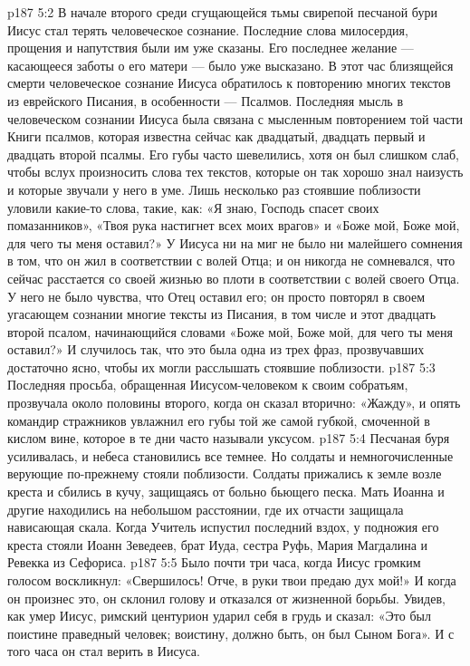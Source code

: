 \vs p187 5:2 В начале второго среди сгущающейся тьмы свирепой песчаной бури Иисус стал терять человеческое сознание. Последние слова милосердия, прощения и напутствия были им уже сказаны. Его последнее желание --- касающееся заботы о его матери --- было уже высказано. В этот час близящейся смерти человеческое сознание Иисуса обратилось к повторению многих текстов из еврейского Писания, в особенности --- Псалмов. Последняя мысль в человеческом сознании Иисуса была связана с мысленным повторением той части Книги псалмов, которая известна сейчас как двадцатый, двадцать первый и двадцать второй псалмы. Его губы часто шевелились, хотя он был слишком слаб, чтобы вслух произносить слова тех текстов, которые он так хорошо знал наизусть и которые звучали у него в уме. Лишь несколько раз стоявшие поблизости уловили какие\hyp{}то слова, такие, как: «Я знаю, Господь спасет своих помазанников», «Твоя рука настигнет всех моих врагов» и «Боже мой, Боже мой, для чего ты меня оставил?» У Иисуса ни на миг не было ни малейшего сомнения в том, что он жил в соответствии с волей Отца; и он никогда не сомневался, что сейчас расстается со своей жизнью во плоти в соответствии с волей своего Отца. У него не было чувства, что Отец оставил его; он просто повторял в своем угасающем сознании многие тексты из Писания, в том числе и этот двадцать второй псалом, начинающийся словами «Боже мой, Боже мой, для чего ты меня оставил?» И случилось так, что это была одна из трех фраз, прозвучавших достаточно ясно, чтобы их могли расслышать стоявшие поблизости.
\vs p187 5:3 \pc Последняя просьба, обращенная Иисусом\hyp{}человеком к своим собратьям, прозвучала около половины второго, когда он сказал вторично: «Жажду», и опять командир стражников увлажнил его губы той же самой губкой, смоченной в кислом вине, которое в те дни часто называли уксусом.
\vs p187 5:4 \pc Песчаная буря усиливалась, и небеса становились все темнее. Но солдаты и немногочисленные верующие по\hyp{}прежнему стояли поблизости. Солдаты прижались к земле возле креста и сбились в кучу, защищаясь от больно бьющего песка. Мать Иоанна и другие находились на небольшом расстоянии, где их отчасти защищала нависающая скала. Когда Учитель испустил последний вздох, у подножия его креста стояли Иоанн Зеведеев, брат Иуда, сестра Руфь, Мария Магдалина и Ревекка из Сефориса.
\vs p187 5:5 Было почти три часа, когда Иисус громким голосом воскликнул: «Свершилось! Отче, в руки твои предаю дух мой!» И когда он произнес это, он склонил голову и отказался от жизненной борьбы. Увидев, как умер Иисус, римский центурион ударил себя в грудь и сказал: «Это был поистине праведный человек; воистину, должно быть, он был Сыном Бога». И с того часа он стал верить в Иисуса.
